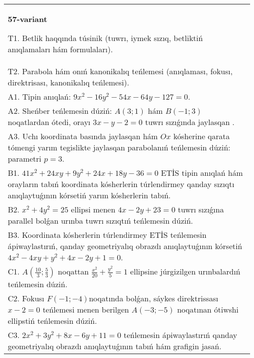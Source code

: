 \documentclass{article}
\begin{document}
\begin{tabular}{m{17cm}}
\textbf{57-variant}
\newline

T1. Betlik haqqında túsinik (tuwrı, iymek sızıq, betliktiń anıqlamaları hám formulaları).\\

T2. Parabola hám onıń kanonikalıq teńlemesi (anıqlaması, fokusı, direktrisası, kanonikalıq teńlemesi).\\

A1. Tipin anıqlań: $9 x^{2}-16 y^{2}-54 x-64 y-127=0$.\\

A2. Sheńber teńlemesin dúziń: $A (3;1) $ hám $B (-1;3) $ noqatlardan ótedi, orayı $3 x-y-2=0$ tuwrı sızıǵında jaylasqan .\\

A3. Uchı koordinata basında jaylasqan hám $Ox$ kósherine qarata tómengi yarım tegislikte jaylasqan parabolanıń teńlemesin dúziń: parametri $p=3$.\\

B1. $41x^{2} + 24xy + 9y^{2} + 24x + 18y - 36 = 0$ ETİS tipin anıqlań hám orayların tabıń koordinata kósherlerin túrlendirmey qanday sızıqtı anıqlaytuǵının kórsetiń yarım kósherlerin tabıń.  \\

B2. $x^{2} + 4y^{2} = 25$ ellipsi menen $4x - 2y + 23 = 0$ tuwrı sızıǵına parallel bolǵan urınba tuwrı sızıqtıń teńlemesin dúziń.  \\

B3. Koordinata kósherlerin túrlendirmey ETİS teńlemesin ápiwaylastırıń, qanday geometriyalıq obrazdı anıqlaytuǵının kórsetiń $4x^{2} - 4xy + y^{2} + 4x - 2y + 1 = 0$.  \\

C1. $A(\frac{10}{3};\frac{5}{3})$ noqattan $\frac{x^{2}}{20} + \frac{y^{2}}{5} = 1$ ellipsine júrgizilgen urınbalardıń teńlemesin dúziń.  \\

C2. Fokusı $F( - 1; - 4)$noqatında bolǵan, sáykes direktrissası $x - 2 = 0$ teńlemesi menen berilgen $A( - 3; - 5)$ noqatınan ótiwshi ellipstiń teńlemesin dúziń.  \\

C3. $2x^{2} + 3y^{2} + 8x - 6y + 11 = 0$ teńlemesin ápiwaylastırıń qanday geometriyalıq obrazdı anıqlaytuǵının tabıń hám grafigin jasań.  \\

\end{tabular}
\vspace{1cm}
\end{document}
